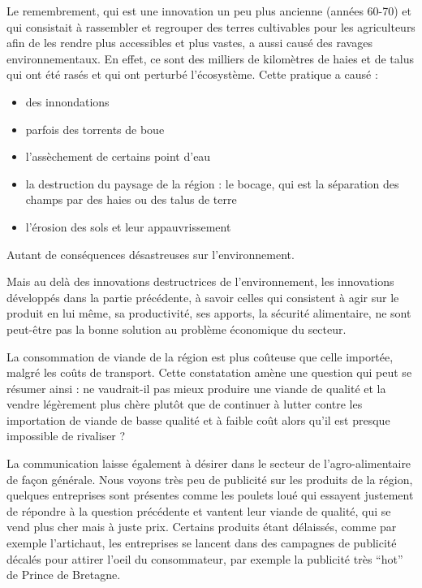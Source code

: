 \documentclass[a4paper,10pt]{report}
\begin{document}
			
			Le remembrement, qui est une innovation un peu plus ancienne (années 60-70) et qui consistait à rassembler et regrouper des terres cultivables pour les agriculteurs afin de les rendre plus accessibles et plus vastes, a aussi causé des ravages environnementaux. En effet, ce sont des milliers de kilomètres de haies et de talus qui ont été rasés et qui ont perturbé l’écosystème. Cette pratique a causé :
			\begin{itemize}
				\item des innondations
				\item parfois des torrents de boue
				\item l’assèchement de certains point d’eau
				\item la destruction du paysage de la région : le bocage, qui est la séparation des champs par des haies ou des talus de terre
				\item l’érosion des sols et leur appauvrissement
			\end{itemize}
			
			Autant de conséquences désastreuses sur l’environnement.	
			
			Mais au delà des innovations destructrices de l’environnement, les innovations développés dans la partie précédente, à savoir celles qui consistent à agir sur le produit en lui même, sa productivité, ses apports, la sécurité alimentaire, ne sont peut-être pas la bonne solution au problème économique du secteur.
			
			La consommation de viande de la région est plus coûteuse que celle importée, malgré les coûts de transport. Cette constatation amène une question qui peut se résumer ainsi : ne vaudrait-il pas mieux produire une viande de qualité et la vendre légèrement plus chère plutôt que de continuer à lutter contre les importation de viande de basse qualité et à faible coût alors qu’il est presque impossible de rivaliser ?
			
			La communication laisse également à désirer dans le secteur de l’agro-alimentaire de façon générale. Nous voyons très peu de publicité sur les produits de la région, quelques entreprises sont présentes comme les poulets loué qui essayent justement de répondre à la question précédente et vantent leur viande de qualité, qui se vend plus cher mais à juste prix.
			Certains produits étant délaissés, comme par exemple l’artichaut, les entreprises se lancent dans des campagnes de publicité décalés pour attirer l’oeil du consommateur, par exemple la publicité très “hot” de Prince de Bretagne.
			
\end{document}
